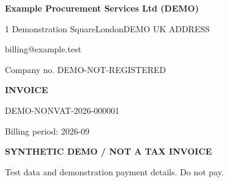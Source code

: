 \documentclass[10pt,a4paper]{article}
\begin{document}
\color{ink}
\raggedright
\begin{minipage}[t]{0.57\textwidth}
\vspace{0pt}
{\Large\bfseries Example Procurement Services Ltd (DEMO)}\par
{\small 1 Demonstration Square\newline{}London\newline{}DEMO UK ADDRESS\par
billing@example.test\par
Company no. DEMO-NOT-REGISTERED

}
\end{minipage}\hfill
\begin{minipage}[t]{0.39\textwidth}\raggedleft
\vspace{0pt}
{\Huge\bfseries INVOICE}\par
{\large DEMO-NONVAT-2026-000001}\par
{\small\color{muted}Billing period: 2026-09}
\end{minipage}
\par\vspace{5mm}

\colorbox{pale}{\parbox{\dimexpr\textwidth-2\fboxsep\relax}{\centering\small\bfseries\color{demo}SYNTHETIC DEMO / NOT A TAX INVOICE\par\normalfont\footnotesize Test data and demonstration payment details. Do not pay.}}
\vspace{4mm}
\end{document}
